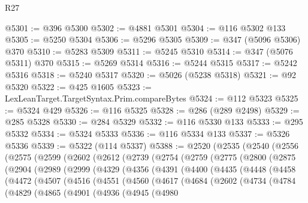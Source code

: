\begin{lexlean}{R27}
\begin{coremodule}
@5301 := @396 @5300
@5302 := @4881 @5301
@5304 := @116 @5302 @133
@5305 := @5250 @5304
@5306 := @5296 @5305
@5309 := @347 (@5096 @5306) @370
@5310 := @5283 @5309
@5311 := @5245 @5310
@5314 := @347 (@5076 @5311) @370
@5315 := @5269 @5314
@5316 := @5244 @5315
@5317 := @5242 @5316
@5318 := @5240 @5317
@5320 := @5026 (@5238 @5318)
@5321 := @92 @5320
@5322 := @425 @1605
@5323 := LexLeanTarget.TargetSyntax.Prim.compareBytes
@5324 := @112 @5323
@5325 := @5324 @429
@5326 := @116 @5325
@5328 := @286 (@289 @2498)
@5329 := @285 @5328
@5330 := @284 @5329
@5332 := @116 @5330 @133
@5333 := @295 @5332
@5334 := @5324 @5333
@5336 := @116 @5334 @133
@5337 := @5326 @5336
@5339 := @5322 (@114 @5337)
@5388 := @2520
    (@2535
      (@2540
        (@2556
          (@2575
            (@2599
              (@2602
                (@2612
                  (@2739
                    (@2754
                      (@2759
                        (@2775
                          (@2800
                            (@2875
                              (@2904
                                (@2989
                                  (@2999
                                    (@4329
                                      (@4356
                                        (@4391
                                          (@4400
                                            (@4435
                                              (@4448
                                                (@4458
                                                  (@4472
                                                    (@4507
                                                      (@4516
                                                        (@4551
                                                          (@4560
                                                            (@4617
                                                              (@4684
                                                                (@2602
                                                                  (@4734
                                                                    (@4784
                                                                      (@4829
                                                                        (@4865
                                                                          (@4901
                                                                            (@4936
                                                                              (@4945
                                                                                (@4980

\end{coremodule}
\end{lexlean}
